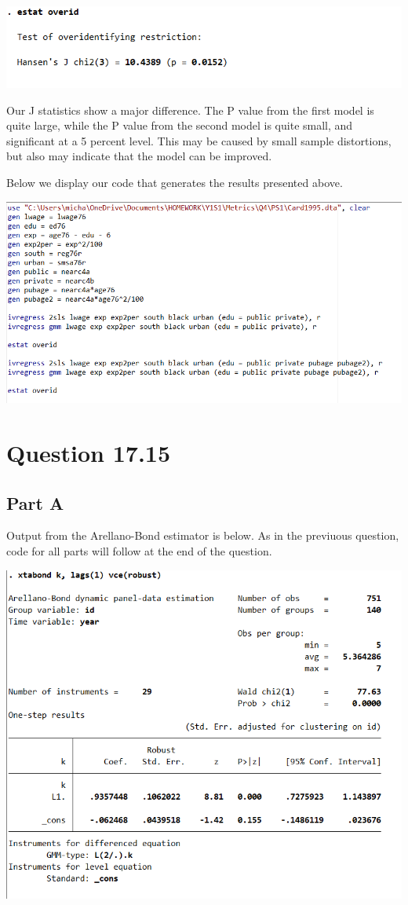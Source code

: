 \documentclass[11pt]{article} %
\begin{document}
\includegraphics{p6}

Our J statistics show a major difference. The P value from the first model is quite large, while the P value from the second model is quite small, and significant at a 5 percent level. This may be caused by small sample distortions, but also may indicate that the model can be improved.

Below we display our code that generates the results presented above.

\includegraphics[scale=0.75]{p7}

\section{Question 17.15}

\subsection{Part A}
Output from the Arellano-Bond estimator is below. As in the previuous question, code for all parts will follow at the end of the question.

\includegraphics{p8}
\end{document}
